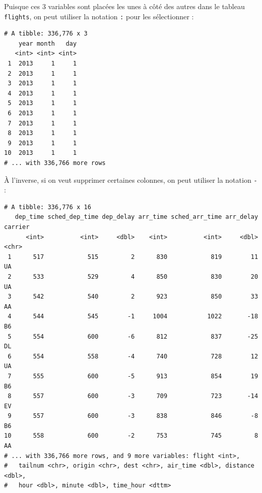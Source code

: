 \documentclass[a4paperpaper,]{article}
\newenvironment{Shaded}{\begin{snugshade}}{\end{snugshade}}
\newcommand{\KeywordTok}[1]{\textcolor[rgb]{0.13,0.29,0.53}{\textbf{#1}}}
\newcommand{\StringTok}[1]{\textcolor[rgb]{0.31,0.60,0.02}{#1}}
\newcommand{\CommentTok}[1]{\textcolor[rgb]{0.56,0.35,0.01}{\textit{#1}}}
\newcommand{\OperatorTok}[1]{\textcolor[rgb]{0.81,0.36,0.00}{\textbf{#1}}}
\newcommand{\NormalTok}[1]{#1}
\theoremstyle{definition}
\theoremstyle{definition}
\theoremstyle{definition}
\theoremstyle{remark}
\begin{document}
Puisque ces 3 variables sont placées les unes à côté des autres dans le
tableau \texttt{flights}, on peut utiliser la notation \texttt{:} pour
les sélectionner :

\begin{Shaded}
\end{Shaded}

\begin{verbatim}
# A tibble: 336,776 x 3
    year month   day
   <int> <int> <int>
 1  2013     1     1
 2  2013     1     1
 3  2013     1     1
 4  2013     1     1
 5  2013     1     1
 6  2013     1     1
 7  2013     1     1
 8  2013     1     1
 9  2013     1     1
10  2013     1     1
# ... with 336,766 more rows
\end{verbatim}

À l'inverse, si on veut supprimer certaines colonnes, on peut utiliser
la notation \texttt{-} :

\begin{Shaded}
\end{Shaded}

\begin{verbatim}
# A tibble: 336,776 x 16
   dep_time sched_dep_time dep_delay arr_time sched_arr_time arr_delay carrier
      <int>          <int>     <dbl>    <int>          <int>     <dbl> <chr>  
 1      517            515         2      830            819        11 UA     
 2      533            529         4      850            830        20 UA     
 3      542            540         2      923            850        33 AA     
 4      544            545        -1     1004           1022       -18 B6     
 5      554            600        -6      812            837       -25 DL     
 6      554            558        -4      740            728        12 UA     
 7      555            600        -5      913            854        19 B6     
 8      557            600        -3      709            723       -14 EV     
 9      557            600        -3      838            846        -8 B6     
10      558            600        -2      753            745         8 AA     
# ... with 336,766 more rows, and 9 more variables: flight <int>,
#   tailnum <chr>, origin <chr>, dest <chr>, air_time <dbl>, distance <dbl>,
#   hour <dbl>, minute <dbl>, time_hour <dttm>
\end{verbatim}
\end{document}
